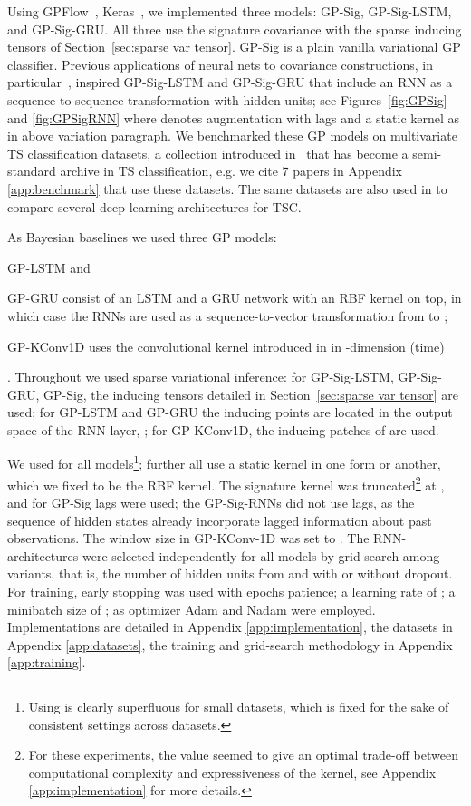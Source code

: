 \documentclass{article}
\begin{document}
Using GPFlow~\cite{Matthews2017GPflowAG}, Keras~\cite{Chollet2015Keras}, we implemented three models: GP-Sig, GP-Sig-LSTM, and GP-Sig-GRU.
All three use the signature covariance with the sparse inducing tensors of Section~\ref{sec:sparse var tensor}.
GP-Sig is a plain vanilla variational GP classifier.
Previous applications of neural nets to covariance constructions, in particular~\cite{Wilson2016DeepK, AlShedivat2017Recurrent}, inspired GP-Sig-LSTM and GP-Sig-GRU that include an RNN as a sequence-to-sequence transformation
with  hidden units; see Figures~\ref{fig:GPSig} and \ref{fig:GPSigRNN} where  denotes augmentation with lags and  a static kernel as in above variation paragraph. We benchmarked these GP models on  multivariate TS classification datasets, a collection introduced in~\cite{baydogan2015multivarate} that has become a semi-standard archive in TS classification, e.g. we cite 7 papers in Appendix \ref{app:benchmark} that use these datasets. The same datasets are also used in \cite{Fawaz2019review} to compare several deep learning architectures for TSC.


As Bayesian baselines we used three GP models: \begin{enumerate*}[label=(\roman*)] \item
GP-LSTM and \item GP-GRU consist of an LSTM and a GRU network with an RBF kernel on top, in which case the RNNs are used as a sequence-to-vector transformation from  to ; \item GP-KConv1D uses the convolutional kernel introduced in \cite{Wilk2017ConvGP} in -dimension (time) \end{enumerate*}. Throughout we used sparse variational inference: for GP-Sig-LSTM, GP-Sig-GRU, GP-Sig, the inducing tensors detailed in Section~\ref{sec:sparse var tensor} are used; for GP-LSTM and GP-GRU the inducing points are located in the output space of the RNN layer, ; for GP-KConv1D, the inducing patches of \cite{Wilk2017ConvGP} are used.

We used  for all models\footnote{Using  is clearly superfluous for small datasets, which is fixed for the sake of consistent settings across datasets.}; further all use a static kernel in one form or another, which we fixed to be the RBF kernel.
The signature kernel was truncated\footnote{For these experiments, the  value seemed to give an optimal trade-off between computational complexity and expressiveness of the kernel, see Appendix \ref{app:implementation} for more details.} at , and for GP-Sig  lags were used; the GP-Sig-RNNs did not use lags, as the sequence of hidden states already incorporate lagged information about past observations. The window size in GP-KConv-1D was set to . 
The RNN-architectures were selected independently for all models by grid-search among  variants, that is, the number of hidden units from  and with or without dropout. For training, early stopping was used with  epochs patience; a learning rate of ; a minibatch size of ; as optimizer Adam \cite{kingma2014adam} and Nadam \cite{Dozat2015IncorporatingNM} were employed. Implementations are detailed in Appendix \ref{app:implementation}, the datasets in Appendix \ref{app:datasets}, the training and grid-search methodology in Appendix \ref{app:training}.
\end{document}
